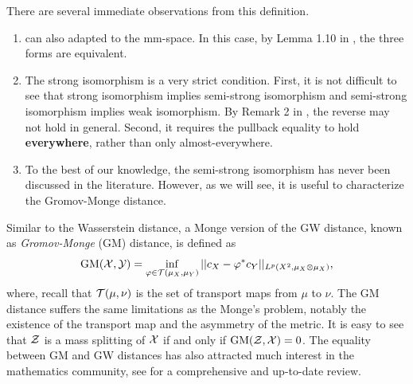 There are several immediate observations from this definition.
\begin{enumerate}
  \item {} can also adapted to the mm-space. In this case,
  by Lemma 1.10 in \citep{Sturm12}, the three forms are equivalent.

  \item The strong isomorphism is a very strict condition. First,
  it is not difficult to see that strong isomorphism implies semi-strong isomorphism and
  semi-strong isomorphism implies weak isomorphism. By Remark 2 in \citep{Chowdhury19},
  the reverse may not hold in general. Second, it requires the pullback equality to hold
  \textbf{everywhere}, rather than only almost-everywhere.

  \item To the best of our knowledge, the semi-strong isomorphism has never been discussed in the literature.
  However, as we will see, it is useful to characterize the Gromov-Monge distance.
\end{enumerate}
Similar to the Wasserstein distance, a Monge version of the GW distance,
known as \textit{Gromov-Monge} (GM) distance, is defined as
\begin{equation}
  \text{GM}(\mathcal X, \mathcal Y) =
  \inf_{\varphi \in \mathcal T(\mu_X, \mu_Y)} || c_X - \varphi^* c_Y ||_{L^p(X^2, \mu_X \otimes \mu_X)},
\end{equation}
where, recall that $\mathcal T(\mu, \nu)$ is the set of transport maps from $\mu$ to $\nu$.
The GM distance suffers the same limitations as the Monge's problem,
notably the existence of the transport map and the asymmetry of the metric.
It is easy to see that $\mathcal Z$ is a mass splitting of $\mathcal X$ if and only if $\text{GM}(\mathcal Z, \mathcal X) = 0$.
The equality between GM and GW distances has also attracted much interest
in the mathematics community, see \citep{Memoli22} for a comprehensive and up-to-date review.

